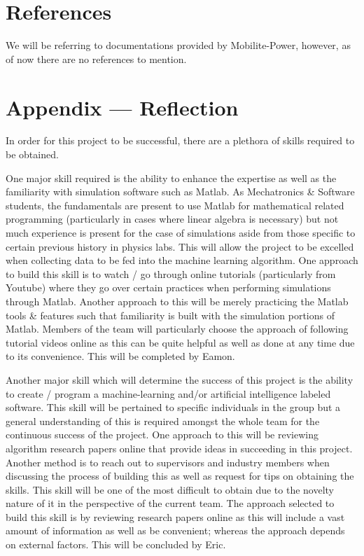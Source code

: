 \documentclass[12pt, titlepage]{article}
\begin{document}
\section*{References}
We will be referring to documentations provided by Mobilite-Power, however, as of now there are no references to mention.





\newpage

\newpage{}
\section*{Appendix --- Reflection}
In order for this project to be successful, there are a plethora of skills required to be obtained. 
\par
One major skill required is the ability to enhance the expertise as well as the familiarity with simulation software such as Matlab. As Mechatronics \& Software students, the fundamentals are present to use Matlab for mathematical related programming (particularly in cases where linear algebra is necessary) but not much experience is present for the case of simulations aside from those specific to certain previous history in physics labs. This will allow the project to be excelled when collecting data to be fed into the machine learning algorithm. One approach to build this skill is to watch / go through online tutorials (particularly from Youtube) where they go over certain practices when performing simulations through Matlab. Another approach to this will be merely practicing the Matlab tools \& features such that familiarity is built with the simulation portions of Matlab. Members of the team will particularly choose the approach of following tutorial videos online as this can be quite helpful as well as done at any time due to its convenience. This will be completed by Eamon. 
\par
Another major skill which will determine the success of this project is the ability to create / program a machine-learning and/or artificial intelligence labeled software. This skill will be pertained to specific individuals in the group but a general understanding of this is required amongst the whole team for the continuous success of the project. One approach to this will be reviewing algorithm research papers online that provide ideas in succeeding in this project. Another method is to reach out to supervisors and industry members when discussing the process of building this as well as request for tips on obtaining the skills. This skill will be one of the most difficult to obtain due to the novelty nature of it in the perspective of the current team. The approach selected to build this skill is by reviewing research papers online as this will include a vast amount of information as well as be convenient; whereas the approach depends on external factors. This will be concluded by Eric.
\end{document}
